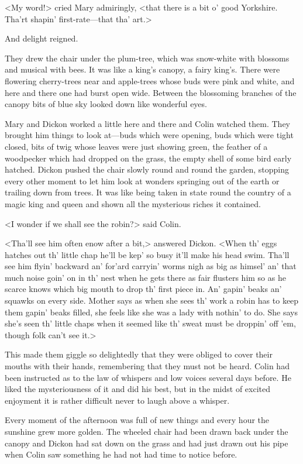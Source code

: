 <My word!> cried Mary admiringly, <that there is a bit o' good Yorkshire. Tha'rt shapin' first-rate—that tha' art.>

And delight reigned.

They drew the chair under the plum-tree, which was snow-white with blossoms and musical with bees. It was like a king's canopy, a fairy king's. There were flowering cherry-trees near and apple-trees whose buds were pink and white, and here and there one had burst open wide. Between the blossoming branches of the canopy bits of blue sky looked down like wonderful eyes.

Mary and Dickon worked a little here and there and Colin watched them. They brought him things to look at—buds which were opening, buds which were tight closed, bits of twig whose leaves were just showing green, the feather of a woodpecker which had dropped on the grass, the empty shell of some bird early hatched. Dickon pushed the chair slowly round and round the garden, stopping every other moment to let him look at wonders springing out of the earth or trailing down from trees. It was like being taken in state round the country of a magic king and queen and shown all the mysterious riches it contained.

<I wonder if we shall see the robin?> said Colin.

<Tha'll see him often enow after a bit,> answered Dickon. <When th' eggs hatches out th' little chap he'll be kep' so busy it'll make his head swim. Tha'll see him flyin' backward an' for'ard carryin' worms nigh as big as himsel' an' that much noise goin' on in th' nest when he gets there as fair flusters him so as he scarce knows which big mouth to drop th' first piece in. An' gapin' beaks an' squawks on every side. Mother says as when she sees th' work a robin has to keep them gapin' beaks filled, she feels like she was a lady with nothin' to do. She says she's seen th' little chaps when it seemed like th' sweat must be droppin' off 'em, though folk can't see it.>

This made them giggle so delightedly that they were obliged to cover their mouths with their hands, remembering that they must not be heard. Colin had been instructed as to the law of whispers and low voices several days before. He liked the mysteriousness of it and did his best, but in the midst of excited enjoyment it is rather difficult never to laugh above a whisper.

Every moment of the afternoon was full of new things and every hour the sunshine grew more golden. The wheeled chair had been drawn back under the canopy and Dickon had sat down on the grass and had just drawn out his pipe when Colin saw something he had not had time to notice before.

